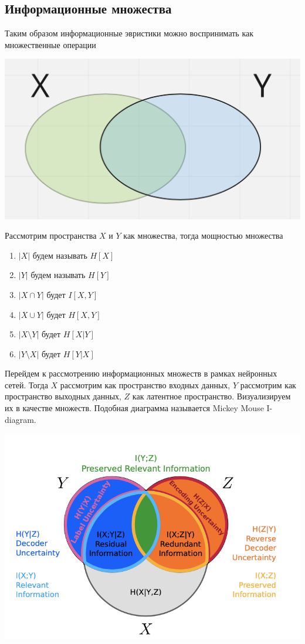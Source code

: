 \subsection{Информационные множества}
Таким образом информационные эвристики можно воспринимать как множественные операции
\begin{center}
    \includegraphics[scale=0.4]{images/information_sets.png}
\end{center}
Рассмотрим пространства $X$ и $Y$ как множества, тогда мощностью множества
\begin{enumerate}
\item $|X|$ будем называть $H[X]$
\item $|Y|$ будем называть $H[Y]$
\item $|X \cap Y|$ будет $I[X, Y]$
\item $|X \cup Y|$ будет $H[X, Y]$
\item $|X \setminus Y|$ будет $H[X | Y]$
\item $|Y \setminus X|$ будет $H[Y | X]$
\end{enumerate}
Перейдем к рассмотрению информационных множеств в рамках нейронных сетей. Тогда $X$ рассмотрим как пространство входных данных, $Y$ рассмотрим как пространство выходных данных, $Z$ как латентное пространство. Визуализируем их в качестве множеств. Подобная диаграмма называется Mickey Mouse I-diagram.
\begin{center}
    \includegraphics[scale=1.]{images/micky_mouse_diagram.png}
\end{center}
